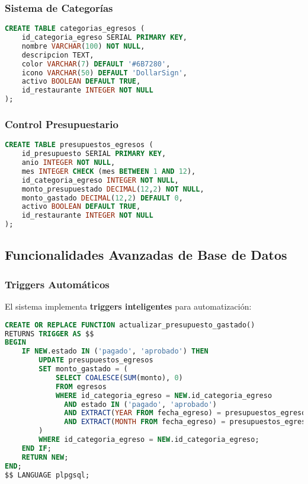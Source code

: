 \documentclass[12pt,a4paper]{article}
\newcommand{\highlight}[1]{\textcolor{primaryblue}{\textbf{#1}}}
\begin{document}
\subsubsection{Sistema de Categorías}
\begin{lstlisting}[language=SQL, caption=Tabla de categorías de egresos]
CREATE TABLE categorias_egresos (
    id_categoria_egreso SERIAL PRIMARY KEY,
    nombre VARCHAR(100) NOT NULL,
    descripcion TEXT,
    color VARCHAR(7) DEFAULT '#6B7280',
    icono VARCHAR(50) DEFAULT 'DollarSign',
    activo BOOLEAN DEFAULT TRUE,
    id_restaurante INTEGER NOT NULL
);
\end{lstlisting}

\subsubsection{Control Presupuestario}
\begin{lstlisting}[language=SQL, caption=Tabla de presupuestos por categoría]
CREATE TABLE presupuestos_egresos (
    id_presupuesto SERIAL PRIMARY KEY,
    anio INTEGER NOT NULL,
    mes INTEGER CHECK (mes BETWEEN 1 AND 12),
    id_categoria_egreso INTEGER NOT NULL,
    monto_presupuestado DECIMAL(12,2) NOT NULL,
    monto_gastado DECIMAL(12,2) DEFAULT 0,
    activo BOOLEAN DEFAULT TRUE,
    id_restaurante INTEGER NOT NULL
);
\end{lstlisting}

\subsection{Funcionalidades Avanzadas de Base de Datos}

\subsubsection{Triggers Automáticos}
El sistema implementa \highlight{triggers inteligentes} para automatización:

\begin{lstlisting}[language=SQL, caption=Trigger para actualización automática de presupuestos]
CREATE OR REPLACE FUNCTION actualizar_presupuesto_gastado()
RETURNS TRIGGER AS $$
BEGIN
    IF NEW.estado IN ('pagado', 'aprobado') THEN
        UPDATE presupuestos_egresos 
        SET monto_gastado = (
            SELECT COALESCE(SUM(monto), 0)
            FROM egresos 
            WHERE id_categoria_egreso = NEW.id_categoria_egreso
              AND estado IN ('pagado', 'aprobado')
              AND EXTRACT(YEAR FROM fecha_egreso) = presupuestos_egresos.anio
              AND EXTRACT(MONTH FROM fecha_egreso) = presupuestos_egresos.mes
        )
        WHERE id_categoria_egreso = NEW.id_categoria_egreso;
    END IF;
    RETURN NEW;
END;
$$ LANGUAGE plpgsql;
\end{lstlisting}
\end{document}
